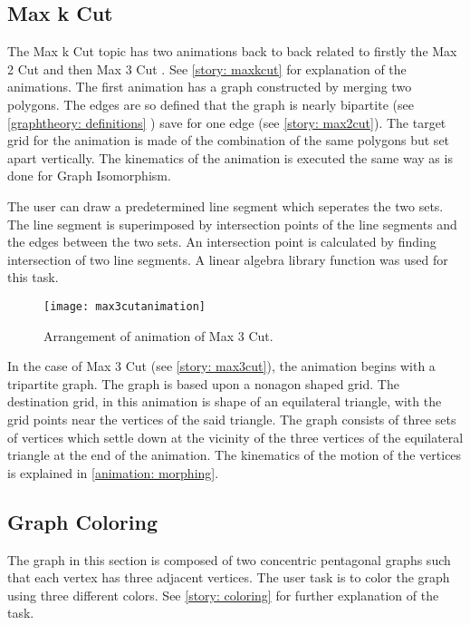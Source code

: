 \subsection{Max k Cut}
\label{impl: maxkcut}
The Max k Cut topic has two animations back to back related to firstly the Max
2 Cut and then Max 3 Cut . See \autoref{story: maxkcut} for explanation of the
animations. The first animation has a graph constructed by merging two polygons.
The edges are so defined that the graph is nearly bipartite (see
\autoref{graphtheory: definitions} ) save for one edge (see \autoref{story:
max2cut}). The target grid for the animation is made of the combination of the
same polygons but set apart vertically. The kinematics of the animation is
executed the same way as is done for Graph Isomorphism.

The user can draw a predetermined line segment which seperates the two
sets. The line segment is superimposed by intersection points of the
line segments and the edges between the two sets. An intersection point
is calculated by finding intersection of two line segments. A linear algebra
library function was used for this task.


\begin{figure}[h]
\centering
\texttt{[image: max3cutanimation]}
\caption{
        Arrangement of animation of Max 3 Cut.
        }
\label{animationfigure: max3cut}
\end{figure}
In the case of Max 3 Cut (see \autoref{story: max3cut}), the animation begins
with a tripartite graph. The graph is based upon a nonagon shaped grid. The
destination grid, in this animation is shape of an equilateral triangle, with
the grid points near the vertices of the said triangle. The graph consists of
three sets of vertices which settle down at the vicinity of the three vertices
of the equilateral triangle at the end of the animation. The kinematics of the
motion of the vertices is explained in \autoref{animation: morphing}.

\subsection{Graph Coloring}
The graph in this section is composed of two concentric pentagonal graphs such
that each vertex has three adjacent vertices. The user task is to color the
graph using three different colors. See \autoref{story: coloring} for further
explanation of the task.


